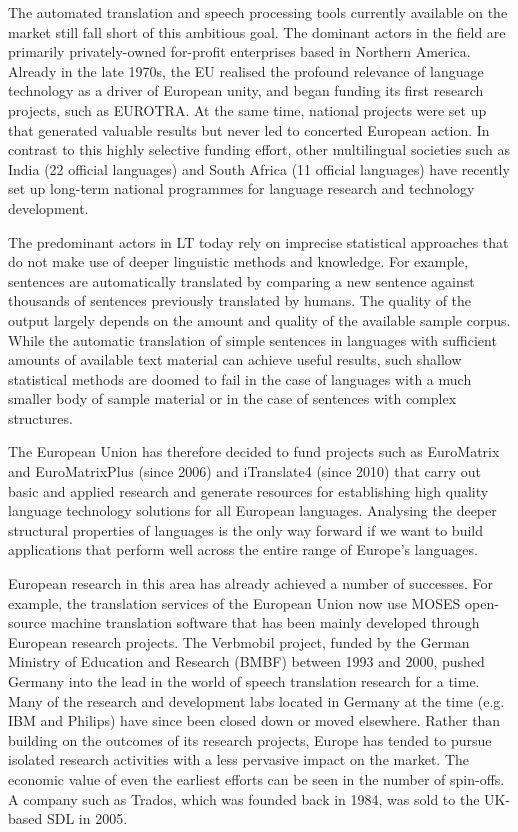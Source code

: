\begin{multicols}{2}

    The automated translation and speech processing tools currently available on the market still fall short of this ambitious goal. The dominant actors in the field are primarily privately-owned for-profit enterprises based in Northern America. Already in the late 1970s, the EU realised the profound relevance of language technology as a driver of European unity, and began funding its first research projects, such as EUROTRA. At the same time, national projects were set up that generated valuable results but never led to concerted European action. In contrast to this highly selective funding effort, other multilingual societies such as India (22 official languages) and South Africa (11 official languages) have recently set up long-term national programmes for language research and technology development. 

    The predominant actors in LT today rely on imprecise statistical approaches that do not make use of deeper linguistic methods and knowledge. For example, sentences are automatically translated by comparing a new sentence against thousands of sentences previously translated by humans. The quality of the output largely depends on the amount and quality of the available sample corpus. While the automatic translation of simple sentences in languages with sufficient amounts of available text material can achieve useful results, such shallow statistical methods are doomed to fail in the case of languages with a much smaller body of sample material or in the case of sentences with complex structures.

    The European Union has therefore decided to fund projects such as EuroMatrix and EuroMatrixPlus (since 2006) and iTranslate4 (since 2010) that carry out basic and applied research and generate resources for establishing high quality language technology solutions for all European languages. Analysing the deeper structural properties of languages is the only way forward if we want to build applications that perform well across the entire range of Europe’s languages.

    European research in this area has already achieved a number of successes. For example, the translation services of the European Union now use MOSES open-source machine translation software that has been mainly developed through European research projects. The Verbmobil project, funded by the German Ministry of Education and Research (BMBF) between 1993 and 2000, pushed Germany into the lead in the world of speech translation research for a time. Many of the research and development labs located in Germany at the time (e.g. IBM and Philips) have since been closed down or moved elsewhere. Rather than building on the outcomes of its research projects, Europe has tended to pursue isolated research activities with a less pervasive impact on the market. The economic value of even the earliest efforts can be seen in the number of spin-offs. A company such as Trados, which was founded back in 1984, was sold to the UK-based SDL in 2005.


\end{multicols}
